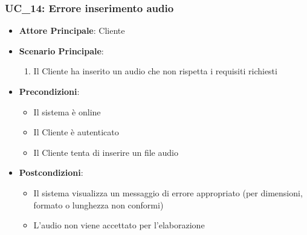 \subsubsection{UC\_14: Errore inserimento audio}
\label{uc_14}

\begin{itemize}
    \item \textbf{Attore Principale}: Cliente
	 \item \textbf{Scenario Principale}:
    \begin{enumerate}
        \item Il Cliente ha inserito un audio che non rispetta i requisiti richiesti
    \end{enumerate}
   \item \textbf{Precondizioni}:
		\begin{itemize}
			\item Il sistema è online
			\item Il Cliente è autenticato
			\item Il Cliente tenta di inserire un file audio
		\end{itemize}
	\item \textbf{Postcondizioni}:
		\begin{itemize}
			\item Il sistema visualizza un messaggio di errore appropriato (per dimensioni, formato o lunghezza non conformi)
			\item L'audio non viene accettato per l'elaborazione
		\end{itemize}
\end{itemize}